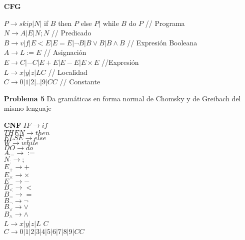 \documentclass{article}
\begin{document}
\begin{enumerate}
\item[\bf{CFG}] 

$P \rightarrow skip |N|$ if $B$ then $P$ else $P |$ while $B$ do $P$   // Programa\\ 
$N \rightarrow A|E|N;N$ // Predicado\\
$B \rightarrow v|f|E<E|E=E|\neg B |B \vee B| B \wedge B $ // Expresión Booleana\\
$A \rightarrow L:=E$ // Asignación\\
$E \rightarrow C|-C|E+E|E-E|E \times E$ //Expresión\\
$L \rightarrow x|y|z|LC$ // Localidad\\
$C \rightarrow 0|1|2|..|9|CC$ // Constante


\item[\bf{Problema 5}] Da gramáticas en forma normal de Chomsky y de Greibach del mismo lenguaje

\item[\bf{CNF}]
$ IF    \rightarrow if$\\
$ THEN  \rightarrow then$\\
$ ELSE  \rightarrow else$\\
$ W \rightarrow while$\\
$ DO    \rightarrow do$\\
$ A_{:=}    \rightarrow  := $\\
$ N_{;}     \rightarrow  ; $\\
$ E_{+}     \rightarrow  + $\\
$ E_{\times} \rightarrow  \times $\\
$ E_{-}     \rightarrow  - $\\
$ B_{<} \rightarrow < $\\
$ B_{=} \rightarrow = $\\
$ B_{\neg} \rightarrow \neg $\\
$ B_{\vee} \rightarrow \vee $\\
$ B_{\wedge} \rightarrow \wedge $\\
$ L        \rightarrow  x|y|z|L$ $C  $\\
$ C     \rightarrow  0|1|2|3|4|5|6|7|8|9|CC$\\


\end{enumerate}
\end{document}
